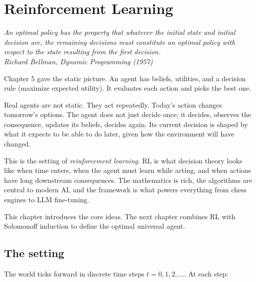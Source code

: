 \chapter{Reinforcement Learning}

\vspace{1em}
\hfill
\begin{minipage}[c]{0.55\textwidth}
\raggedleft
\small\itshape
An optimal policy has the property that whatever the initial state and initial decision are, the remaining decisions must constitute an optimal policy with respect to the state resulting from the first decision.\\[0.5em]
\upshape\footnotesize Richard Bellman, \textit{Dynamic Programming} (1957)
\end{minipage}%
\hspace{0.5em}
\begin{minipage}[c]{0.12\textwidth}
\end{minipage}
\vspace{1.5em}

\noindent Chapter 5 gave the static picture. An agent has beliefs, utilities, and a decision rule (maximize expected utility). It evaluates each action and picks the best one.

Real agents are not static. They act repeatedly. Today's action changes tomorrow's options. The agent does not just decide once; it decides, observes the consequence, updates its beliefs, decides again. Its current decision is shaped by what it expects to be able to do later, given how the environment will have changed.

This is the setting of \emph{reinforcement learning}. RL is what decision theory looks like when time enters, when the agent must learn while acting, and when actions have long downstream consequences. The mathematics is rich, the algorithms are central to modern AI, and the framework is what powers everything from chess engines to LLM fine-tuning.

This chapter introduces the core ideas. The next chapter combines RL with Solomonoff induction to define the optimal universal agent.

\section*{The setting}

The world ticks forward in discrete time steps $t = 0, 1, 2, \ldots$. At each step:

